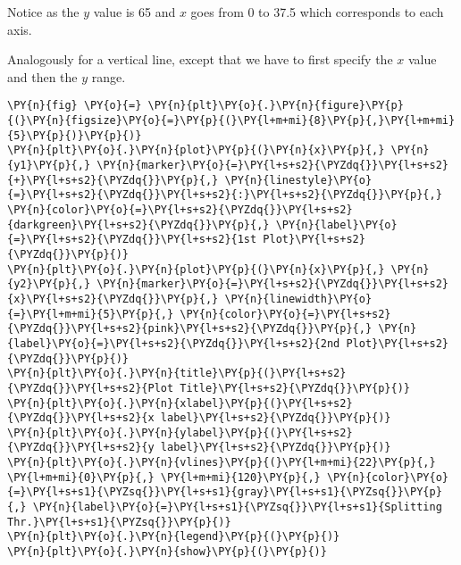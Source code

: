     Notice as the \(y\) value is 65 and \(x\) goes from 0 to 37.5 which
corresponds to each axis.

Analogously for a vertical line, except that we have to first specify
the \(x\) value and then the \(y\) range.

    \begin{tcolorbox}[breakable, size=fbox, boxrule=1pt, pad at break*=1mm,colback=cellbackground, colframe=cellborder]
\begin{Verbatim}[commandchars=\\\{\}]
\PY{n}{fig} \PY{o}{=} \PY{n}{plt}\PY{o}{.}\PY{n}{figure}\PY{p}{(}\PY{n}{figsize}\PY{o}{=}\PY{p}{(}\PY{l+m+mi}{8}\PY{p}{,}\PY{l+m+mi}{5}\PY{p}{)}\PY{p}{)}
\PY{n}{plt}\PY{o}{.}\PY{n}{plot}\PY{p}{(}\PY{n}{x}\PY{p}{,} \PY{n}{y1}\PY{p}{,} \PY{n}{marker}\PY{o}{=}\PY{l+s+s2}{\PYZdq{}}\PY{l+s+s2}{+}\PY{l+s+s2}{\PYZdq{}}\PY{p}{,} \PY{n}{linestyle}\PY{o}{=}\PY{l+s+s2}{\PYZdq{}}\PY{l+s+s2}{:}\PY{l+s+s2}{\PYZdq{}}\PY{p}{,} \PY{n}{color}\PY{o}{=}\PY{l+s+s2}{\PYZdq{}}\PY{l+s+s2}{darkgreen}\PY{l+s+s2}{\PYZdq{}}\PY{p}{,} \PY{n}{label}\PY{o}{=}\PY{l+s+s2}{\PYZdq{}}\PY{l+s+s2}{1st Plot}\PY{l+s+s2}{\PYZdq{}}\PY{p}{)}
\PY{n}{plt}\PY{o}{.}\PY{n}{plot}\PY{p}{(}\PY{n}{x}\PY{p}{,} \PY{n}{y2}\PY{p}{,} \PY{n}{marker}\PY{o}{=}\PY{l+s+s2}{\PYZdq{}}\PY{l+s+s2}{x}\PY{l+s+s2}{\PYZdq{}}\PY{p}{,} \PY{n}{linewidth}\PY{o}{=}\PY{l+m+mi}{5}\PY{p}{,} \PY{n}{color}\PY{o}{=}\PY{l+s+s2}{\PYZdq{}}\PY{l+s+s2}{pink}\PY{l+s+s2}{\PYZdq{}}\PY{p}{,} \PY{n}{label}\PY{o}{=}\PY{l+s+s2}{\PYZdq{}}\PY{l+s+s2}{2nd Plot}\PY{l+s+s2}{\PYZdq{}}\PY{p}{)}
\PY{n}{plt}\PY{o}{.}\PY{n}{title}\PY{p}{(}\PY{l+s+s2}{\PYZdq{}}\PY{l+s+s2}{Plot Title}\PY{l+s+s2}{\PYZdq{}}\PY{p}{)}
\PY{n}{plt}\PY{o}{.}\PY{n}{xlabel}\PY{p}{(}\PY{l+s+s2}{\PYZdq{}}\PY{l+s+s2}{x label}\PY{l+s+s2}{\PYZdq{}}\PY{p}{)}
\PY{n}{plt}\PY{o}{.}\PY{n}{ylabel}\PY{p}{(}\PY{l+s+s2}{\PYZdq{}}\PY{l+s+s2}{y label}\PY{l+s+s2}{\PYZdq{}}\PY{p}{)}
\PY{n}{plt}\PY{o}{.}\PY{n}{vlines}\PY{p}{(}\PY{l+m+mi}{22}\PY{p}{,} \PY{l+m+mi}{0}\PY{p}{,} \PY{l+m+mi}{120}\PY{p}{,} \PY{n}{color}\PY{o}{=}\PY{l+s+s1}{\PYZsq{}}\PY{l+s+s1}{gray}\PY{l+s+s1}{\PYZsq{}}\PY{p}{,} \PY{n}{label}\PY{o}{=}\PY{l+s+s1}{\PYZsq{}}\PY{l+s+s1}{Splitting Thr.}\PY{l+s+s1}{\PYZsq{}}\PY{p}{)}
\PY{n}{plt}\PY{o}{.}\PY{n}{legend}\PY{p}{(}\PY{p}{)}
\PY{n}{plt}\PY{o}{.}\PY{n}{show}\PY{p}{(}\PY{p}{)}
\end{Verbatim}
\end{tcolorbox}

    \begin{center}
    \end{center}
    { \hspace*{\fill} \\}
    
